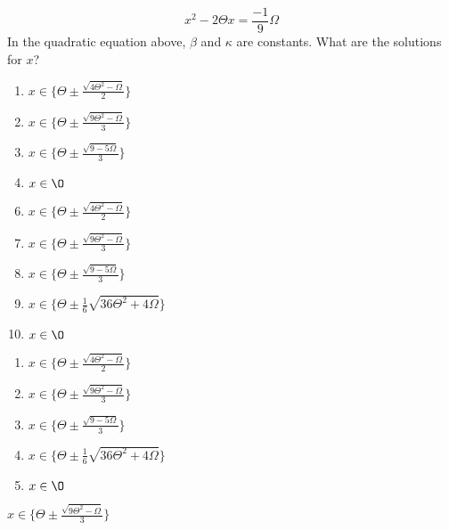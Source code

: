  
$$x^2-2\Theta x=\frac{-1}{9}\Omega $$
In the quadratic equation above, $\beta$ and $\kappa$ are constants.  What are the solutions for $x$?


\ifsat
	\begin{enumerate}[label=\Alph*)]
		\item {\large$x\in\{\Theta\pm\frac{\sqrt{4\Theta^2-\Omega}}{2}\} $}
		\item {\large$x\in\{\Theta\pm\frac{\sqrt{9\Theta^2-\Omega}}{3}\} $} %
		\item {\large$x\in\{\Theta\pm\frac{\sqrt{9-5\Omega}}{3}\} $ }
		\item $x\in\O$
	\end{enumerate}
\else
\fi

\ifacteven
	\begin{enumerate}[label=\textbf{\Alph*.},itemsep=\fill,align=left]
		\setcounter{enumii}{5}
		\item {\large$x\in\{\Theta\pm\frac{\sqrt{4\Theta^2-\Omega}}{2}\} $}
		\item {\large$x\in\{\Theta\pm\frac{\sqrt{9\Theta^2-\Omega}}{3}\} $} %
		\item {\large$x\in\{\Theta\pm\frac{\sqrt{9-5\Omega}}{3}\} $ }
		\addtocounter{enumii}{1}
		\item {\large$x\in\{\Theta\pm\frac{1}{6}\sqrt{36\Theta^2+4\Omega}\} $}
		\item $x\in\O$
	\end{enumerate}
\else
\fi

\ifactodd
	\begin{enumerate}[label=\textbf{\Alph*.},itemsep=\fill,align=left]
		\item {\large$x\in\{\Theta\pm\frac{\sqrt{4\Theta^2-\Omega}}{2}\} $}
		\item {\large$x\in\{\Theta\pm\frac{\sqrt{9\Theta^2-\Omega}}{3}\} $} %
		\item {\large$x\in\{\Theta\pm\frac{\sqrt{9-5\Omega}}{3}\} $ }
		\item {\large$x\in\{\Theta\pm\frac{1}{6}\sqrt{36\Theta^2+4\Omega}\} $}
		\item $x\in\O$
	\end{enumerate}
\else
\fi

\ifgridin
 {\large$x\in\{\Theta\pm\frac{\sqrt{9\Theta^2-\Omega}}{3}\} $} %
		
\else
\fi

